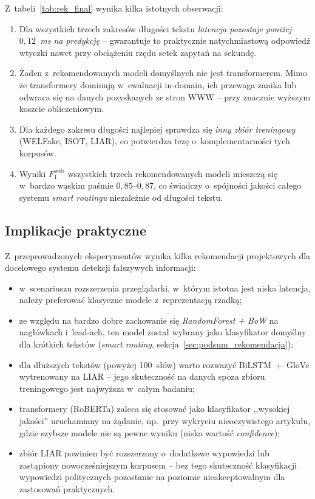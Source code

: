 \documentclass[oneside,polski,logo]{amuthesis}
\begin{document}
Z~tabeli~\ref{tab:rek_final} wynika kilka istotnych obserwacji:

\begin{enumerate}
  \item Dla wszystkich trzech zakresów długości tekstu \emph{latencja
        pozostaje poniżej $0{,}12$~ms na predykcję} -- gwarantuje to
        praktycznie natychmiastową odpowiedź wtyczki nawet przy
        obciążeniu rzędu setek zapytań na sekundę.
  \item Żaden z~rekomendowanych modeli domyślnych nie jest
        transformerem. Mimo że transformery dominują w~ewaluacji
        in-domain, ich przewaga zanika lub odwraca się na danych
        pozyskanych ze stron WWW -- przy znacznie wyższym koszcie
        obliczeniowym.
  \item Dla każdego zakresu długości najlepiej sprawdza się
        \emph{inny zbiór treningowy} (WELFake, ISOT, LIAR), co
        potwierdza tezę o~komplementarności tych korpusów.
  \item Wyniki $F_1^{\text{web}}$ wszystkich trzech rekomendowanych
        modeli mieszczą się w~bardzo wąskim paśmie
        \(0{,}85\)--\(0{,}87\), co świadczy o~spójności jakości
        całego systemu \textit{smart routingu} niezależnie od
        długości tekstu.
\end{enumerate}

\subsection{Implikacje praktyczne}
\label{sec:podsum_praktyczne}

Z~przeprowadzonych eksperymentów wynika kilka rekomendacji
projektowych dla docelowego systemu detekcji fałszywych informacji:

\begin{itemize}
  \item w~scenariuszu rozszerzenia przeglądarki, w~którym istotna
        jest niska latencja, należy preferować klasyczne modele
        z~reprezentacją rzadką;
  \item ze względu na bardzo dobre zachowanie się \textit{RandomForest
        + BoW} na nagłówkach i~lead-ach, ten model został wybrany
        jako klasyfikator domyślny dla krótkich tekstów
        (\textit{smart routing}, sekcja~\ref{sec:podsum_rekomendacja});
  \item dla dłuższych tekstów (powyżej 100~słów) warto rozważyć
        BiLSTM~+~GloVe wytrenowany na LIAR -- jego skuteczność na
        danych spoza zbioru treningowego jest najwyższa w~całym
        badaniu;
  \item transformery (RoBERTa) zaleca się stosować jako klasyfikator
        ,,wysokiej jakości'' uruchamiany na żądanie, np.\ przy
        wykryciu nieoczywistego artykułu, gdzie szybsze modele nie
        są pewne wyniku (niska wartość \textit{confidence});
  \item zbiór LIAR powinien być rozszerzony o~dodatkowe wypowiedzi
        lub zastąpiony nowocześniejszym korpusem -- bez tego
        skuteczność klasyfikacji wypowiedzi politycznych pozostanie
        na poziomie nieakceptowalnym dla zastosowań praktycznych.
\end{itemize}
\end{document}
